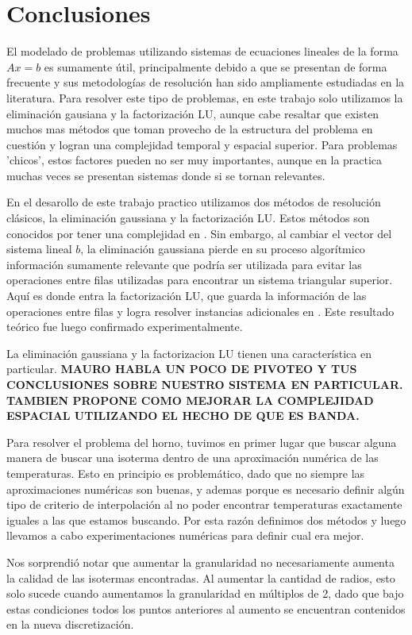 \section{Conclusiones}

El modelado de problemas utilizando sistemas de ecuaciones lineales de la forma $Ax = b$ es sumamente útil, principalmente debido a que se presentan de forma frecuente y sus metodologías de resolución han sido ampliamente estudiadas en la literatura. Para resolver este tipo de problemas, en este trabajo solo utilizamos la eliminación gausiana y la factorización LU, aunque cabe resaltar que existen muchos mas métodos que toman provecho de la estructura del problema en cuestión y logran una complejidad temporal y espacial superior. Para problemas 'chicos', estos factores pueden no ser muy importantes, aunque en la practica muchas veces se presentan sistemas donde si se tornan relevantes.

En el desarollo de este trabajo practico utilizamos dos métodos de resolución clásicos, la eliminación gaussiana y la factorización LU. Estos métodos son conocidos por tener una complejidad en . Sin embargo, al cambiar el vector del sistema lineal $b$, la eliminación gaussiana pierde en su proceso algorítmico información sumamente relevante que podría ser utilizada para evitar las operaciones entre filas utilizadas para encontrar un sistema triangular superior. Aquí es donde entra la factorización LU, que guarda la información de las operaciones entre filas y logra resolver instancias adicionales en . Este resultado teórico fue luego confirmado experimentalmente.

La eliminación gaussiana y la factorizacion LU tienen una característica en particular. \textbf{MAURO HABLA UN POCO DE PIVOTEO Y TUS CONCLUSIONES SOBRE NUESTRO SISTEMA EN PARTICULAR. TAMBIEN PROPONE COMO MEJORAR LA COMPLEJIDAD ESPACIAL UTILIZANDO EL HECHO DE QUE ES BANDA.}

Para resolver el problema del horno, tuvimos en primer lugar que buscar alguna manera de buscar una isoterma dentro de una aproximación numérica de las temperaturas. Esto en principio es problemático, dado que no siempre las aproximaciones numéricas son buenas, y ademas porque es necesario definir algún tipo de criterio de interpolación al no poder encontrar temperaturas exactamente iguales a las que estamos buscando. Por esta razón definimos dos métodos y luego llevamos a cabo experimentaciones numéricas para definir cual era mejor. 

Nos sorprendió notar que aumentar la granularidad no necesariamente aumenta la calidad de las isotermas encontradas. Al aumentar la cantidad de radios, esto solo sucede cuando aumentamos la granularidad en múltiplos de 2, dado que bajo estas condiciones todos los puntos anteriores al aumento se encuentran contenidos en la nueva discretización.

